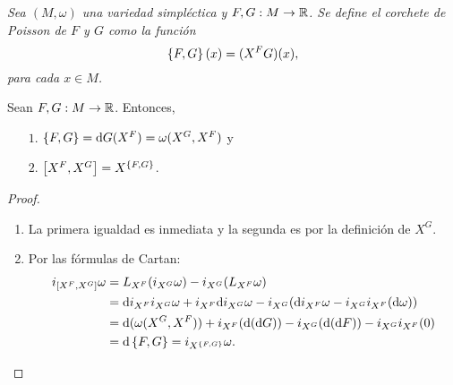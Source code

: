 \begin{defn}
  \em
  Sea $(M,\omega)$ una variedad simpléctica y $F,G: M \rightarrow \mathbb{R}$. Se define el \emph{corchete de Poisson de $F$ y $G$} como la función
\begin{equation*}
  \left\lbrace F,G\right\rbrace(x) = (X^F G)(x),
\end{equation*}
para cada $x \in M$.
\end{defn}
\begin{prop}\leavevmode
  Sean $F,G:M\rightarrow \mathbb{R}$. Entonces,
  \begin{enumerate}
    \item[$1$.] $\left\lbrace F,G\right\rbrace = \mathrm{d} G (X^F)= \omega(X^G, X^F)$ y
    \item[$2$.] $\left[X^F,X^G\right] = X^{\left\lbrace F,G\right\rbrace}$.
  \end{enumerate}
\end{prop}
\begin{proof}\leavevmode
  \begin{enumerate}
    \item La primera igualdad es inmediata y la segunda es por la definición de $X^G$.
    \item Por las fórmulas de Cartan:
      \begin{align*}
	i_{\left[X^F,X^G\right]} \omega & =  L_{X^F}(i_{X^G}\omega) - i_{X^G}(L_{X^F} \omega) \\ 
	& = \mathrm{d} i_{X^F}i_{X^G}\omega + i_{X^F}\mathrm{d} i_{X^G}\omega - i_{X^G}(\mathrm{d} i_{X^F}\omega - i_{X^G}i_{X^F}(\mathrm{d} \omega)) \\
	& = \mathrm{d} (\omega(X^G,X^F)) + i_{X^F}(\mathrm{d}(\mathrm{d} G)) - i_{X^G}(\mathrm{d} (\mathrm{d} F)) - i_{X^G}i_{X^F}(0) \\
	& = \mathrm{d} \left\lbrace F,G\right\rbrace = i_{X^{\left\lbrace F,G\right\rbrace}}\omega.
      \end{align*}
  \end{enumerate}
\end{proof}

